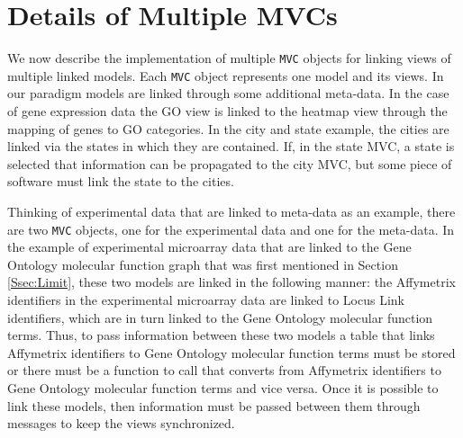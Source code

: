 \documentclass{article}[11pt]
\newcommand{\Robject}[1]{{\texttt{#1}}}
\begin{document}
\section{Details of Multiple MVCs}
\label{Sec:MultMVC}

We now describe the implementation of multiple \Robject{MVC} objects for
linking views of multiple linked models.  Each \Robject{MVC} object
represents one model and its views.  In our
paradigm models are linked through some additional meta-data. In
the case of gene expression data the GO view is linked to the heatmap
view through the mapping of genes to GO categories. In the city and
state example, the cities are linked via the states in which they are
contained. If, in the state MVC, a state is selected that information
can be propagated to the city MVC, but some piece of software must
link the state to the cities. 

Thinking of experimental data that are linked to meta-data as an example, there
are two \Robject{MVC} objects, one for the experimental data and one for the
meta-data.  In the example of experimental microarray data that are linked to
the Gene Ontology molecular function graph that was first mentioned in Section
\ref{Ssec:Limit}, these two models are linked in the following manner: the
Affymetrix identifiers in the experimental microarray data are linked to Locus
Link identifiers, which are in turn linked to the Gene Ontology molecular
function terms.  Thus, to pass information between these two models a table
that links Affymetrix identifiers to Gene Ontology molecular function terms
must be stored or there must be a function to call that converts from
Affymetrix identifiers to Gene Ontology molecular function terms and vice
versa.  Once it is possible to link these models, then information must be
passed between them through messages to keep the views synchronized.
\end{document}
